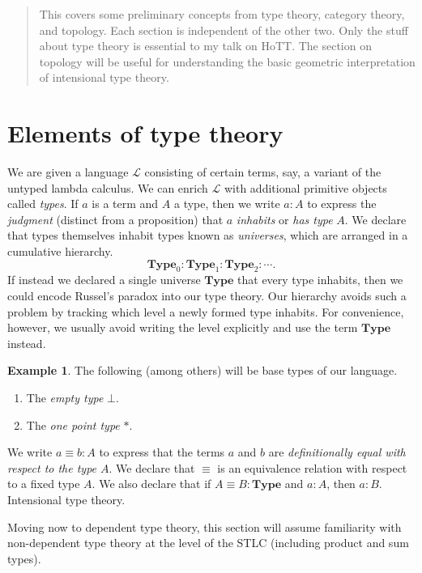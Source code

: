 \documentclass[10pt,letterpaper,cm]{nupset}
\theoremstyle{definition}
\newtheorem{exmp}{Example}
\newcommand{\1}{\mathbf{1}}
\newcommand{\0}{\vec 0}
\begin{document}
\begin{abstract}
This covers some preliminary concepts from type theory, category theory, and topology. Each section is independent of the other two. Only the stuff about type theory is essential to my talk on HoTT. The section on topology will be useful for understanding the basic geometric interpretation of intensional type theory.
\end{abstract}

\tableofcontents
\newpage

\section{Elements of type theory}

We are given a language $\mathcal{L}$ consisting of certain terms, say, a variant of the untyped lambda calculus. We can enrich $\mathcal{L}$ with additional primitive objects called \textit{types}. If $a$ is a term and $A$ a type, then we write $a: A$ to express the \textit{judgment} (distinct from a proposition) that $a$ \textit{inhabits} or \textit{has type} $A$. We declare that types themselves inhabit types known as \textit{universes}, which are arranged in a cumulative hierarchy. $$\mathbf{Type}_0 :\mathbf{Type}_1 : \mathbf{Type}_2 : \cdots . $$ If instead we declared a single universe $\mathbf{Type}$ that every type inhabits, then we could encode Russel's paradox into our type theory. Our hierarchy avoids such a problem by tracking which level a newly formed type inhabits. For convenience, however, we usually avoid writing the level explicitly and use the term $\mathbf{Type}$ instead.
\begin{exmp} The following (among others) will be base types of our language.
\begin{enumerate}
\item The \textit{empty type} $\bot$.
\item The \textit{one point type} $\ast$.
\end{enumerate}
\end{exmp}
We write $a\equiv b :A$ to express that the terms $a$ and $b$ are \textit{definitionally equal with respect to the type $A$}. We declare that $\equiv$ is an equivalence relation with respect to a fixed type $A$. We also declare that if $A\equiv B : \mathbf{Type}$ and $a: A$, then $a:B$. Intensional type theory.

Moving now to dependent type theory, this section will assume familiarity with non-dependent type theory at the level of the STLC (including product and sum types).
\end{document}
